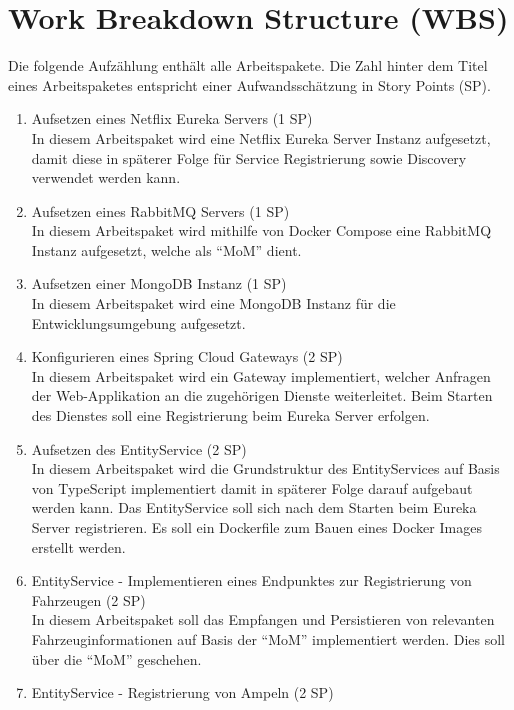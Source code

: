 \section{Work Breakdown Structure (WBS)}

Die folgende Aufzählung enthält alle Arbeitspakete.
Die Zahl hinter dem Titel eines Arbeitspaketes entspricht einer Aufwandsschätzung in Story Points (SP).

\begin{enumerate}
  \item Aufsetzen eines Netflix Eureka Servers (1 SP)\\
  		In diesem Arbeitspaket wird eine Netflix Eureka Server Instanz aufgesetzt, damit diese in späterer Folge für Service Registrierung sowie Discovery verwendet werden kann.
  \item Aufsetzen eines RabbitMQ Servers (1 SP)\\
  		In diesem Arbeitspaket wird mithilfe von Docker Compose eine RabbitMQ Instanz aufgesetzt, welche als \enquote{MoM} dient.
  \item Aufsetzen einer MongoDB Instanz (1 SP)\\
  		In diesem Arbeitspaket wird eine MongoDB Instanz für die Entwicklungsumgebung aufgesetzt.
  \item Konfigurieren eines Spring Cloud Gateways (2 SP)\\
  		In diesem Arbeitspaket wird ein Gateway implementiert, welcher Anfragen der Web-Applikation an die zugehörigen Dienste weiterleitet.
  		Beim Starten des Dienstes soll eine Registrierung beim Eureka Server erfolgen.
  \item Aufsetzen des EntityService (2 SP)\\
  		In diesem Arbeitspaket wird die Grundstruktur des EntityServices auf Basis von TypeScript implementiert damit in späterer Folge darauf aufgebaut werden kann.
  		Das EntityService soll sich nach dem Starten beim Eureka Server registrieren.
  		Es soll ein Dockerfile zum Bauen eines Docker Images erstellt werden.
  \item EntityService - Implementieren eines Endpunktes zur Registrierung von Fahrzeugen (2 SP)\\
  		In diesem Arbeitspaket soll das Empfangen und Persistieren von relevanten Fahrzeuginformationen auf Basis der \enquote{MoM} implementiert werden.
  		Dies soll über die \enquote{MoM} geschehen.
  \item EntityService - Registrierung von Ampeln (2 SP)\\

\end{enumerate}
